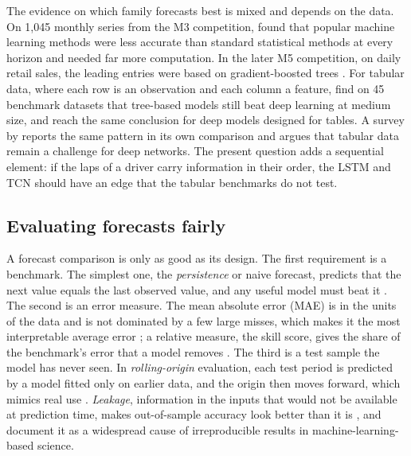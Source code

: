 \documentclass[12pt]{article}
\begin{document}
The evidence on which family forecasts best is mixed and depends on the data. On 1,045 monthly series from the M3
competition, \textcite{makridakis2018} found that popular machine learning methods were less accurate than standard
statistical methods at every horizon and needed far more computation. In the later M5 competition, on daily retail
sales, the leading entries were based on gradient-boosted trees \parencite{makridakis2022}. For tabular data, where each
row is an observation and each column a feature, \textcite{grinsztajn2022} find on 45 benchmark datasets that
tree-based models still beat deep learning at medium size, and \textcite{shwartzziv2022} reach the same conclusion for
deep models designed for tables. A survey by \textcite{borisov2024} reports the same pattern in its own comparison and
argues that tabular data remain a challenge for deep networks. The present question adds a sequential element: if the
laps of a driver carry information in their order, the LSTM and TCN should have an edge that the tabular benchmarks do
not test.

\subsection{Evaluating forecasts fairly}\label{sec:lit-eval}

A forecast comparison is only as good as its design. The first requirement is a benchmark. The simplest one, the
\emph{persistence} or naive forecast, predicts that the next value equals the last observed value, and any useful
model must beat it \parencite{hyndman2021}. The second is an error measure. The mean absolute error (MAE) is in the
units of the data and is not dominated by a few large misses, which makes it the most interpretable average error
\parencite{willmott2005}; a relative measure, the skill score, gives the share of the benchmark's error that a model
removes \parencite{hyndman2006}. The third is a test sample the model has never seen. In \emph{rolling-origin} evaluation, each test period
is predicted by a model fitted only on earlier data, and the origin then moves forward, which mimics real use
\parencite{tashman2000}. \emph{Leakage}, information in the inputs that would not be available at prediction time, makes
out-of-sample accuracy look better than it is \parencite{kaufman2012}, and \textcite{kapoor2023} document it as a
widespread cause of irreproducible results in machine-learning-based science.
\end{document}
